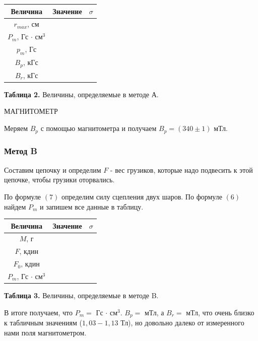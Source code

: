 \documentclass{article}
\begin{document}
\begin{center}
    \begin{tabular}{|c|c|c|}
        \hline
        Величина & Значение & $\sigma$ \\
        \hline
        $r_{max}$, см & &  \\
        \hline
        $P_m$, Гс $\cdot$ см$^3$ &  &  \\
        \hline
        $p_m$, Гс &  &  \\
        \hline
        $B_p$, кГс &  &  \\
        \hline
        $B_r$, кГс &  &  \\
        \hline
    \end{tabular}
    
    \textbf{Таблица 2.} Величины, определяемые в методе А.
\end{center}

\begin{center}
    \LARGE {МАГНИТОМЕТР}
\end{center}

Меряем $B_p$ с помощью магнитометра и получаем $B_p = (340 \pm 1)$ мТл.

\subsubsection*{Метод B}

Составим цепочку и определим $F$ - вес грузиков, которые надо подвесить к этой цепочке, чтобы грузики оторвались. 

По формуле $(7)$ определим силу сцепления двух шаров. По формуле $(6)$ найдем $P_m$ и запишем все данные в таблицу.

\begin{center}
    \begin{tabular}{|c|c|c|}
    \hline
        Величина & Значение & $\sigma$ \\
        \hline
        $M$, г &  &  \\
        \hline
        $F$, кдин & & \\
        \hline
        $F_0$, кдин & & \\
        \hline
        $P_m$, Гс $\cdot$ см$^3$ & & \\
        \hline
    \end{tabular}
    
    \textbf{Таблица 3.} Величины, определяемые в методе B.
\end{center}

В итоге получаем, что $P_m = $ Гс $\cdot$ см$^3$. $B_p = $ мТл, а $B_r = $ мТл, что очень близко к табличным значениям ($1,03 - 1,13$ Тл), но довольно далеко от измеренного нами поля магнитометром.
\end{document}
